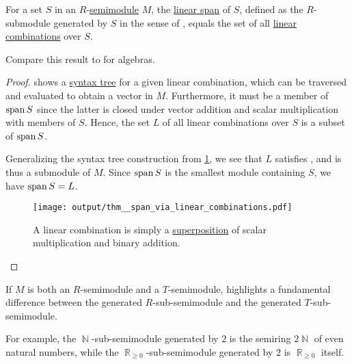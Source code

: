 \begin{proposition}\label{thm:span_via_linear_combinations}
  For a set \( S \) in an \( R \)-\hyperref[def:semimodule]{semimodule} \( M \), the \hyperref[def:semimodule/submodel]{linear span} of \( S \), defined as the \( R \)-submodule generated by \( S \) in the sense of , equals the set of all \hyperref[def:linear_combination]{linear combinations} over \( S \).

  Compare this result to  for algebras.
\end{proposition}
\begin{proof}
   shows a \hyperref[def:concrete_syntax_tree]{syntax tree} for a given linear combination, which can be traversed and evaluated to obtain a vector in \( M \). Furthermore, it must be a member of \( \operatorname{span} S \) since the latter is closed under vector addition and scalar multiplication with members of \( S \). Hence, the set \( L \) of all linear combinations over \( S \) is a subset of \( \operatorname{span} S \).

  Generalizing the syntax tree construction from \cref{fig:thm:span_via_linear_combinations}, we see that \( L \) satisfies , and is thus a submodule of \( M \). Since \( \operatorname{span} S \) is the smallest module containing \( S \), we have \( \operatorname{span} S = L \).

  \begin{figure}[h]
    \hfill
    \texttt{[image: output/thm\_\_span\_via\_linear\_combinations.pdf]}
    \hfill\hfill
    \caption{A linear combination is simply a \hyperref[def:multi_valued_function/superposition]{superposition} of scalar multiplication and binary addition.}
    \label{fig:thm:span_via_linear_combinations}
  \end{figure}
\end{proof}

\begin{remark}\label{rem:span_over_different_semirings}
  If \( M \) is both an \( R \)-semimodule and a \( T \)-semimodule,  highlights a fundamental difference between the generated \( R \)-sub-semimodule and the generated \( T \)-sub-semimodule.

  For example, the \( \BbbN \)-sub-semimodule generated by \( 2 \) is the semiring \( 2\BbbN \) of even natural numbers, while the \( \BbbR_{\geq 0} \)-sub-semimodule generated by \( 2 \) is \( \BbbR_{\geq 0} \) itself.
\end{remark}

